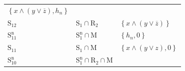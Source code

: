 \documentclass[10pt,a4paper]{article}
\newcommand{\ovl}{\overline}
\newcommand{\set}[1]{\left\{#1\right\}}
\newcommand{\clonefont}[1]{\mathrm{#1}}
\begin{document}
\begin{figure}[hbtp]
\begin{small}
\begin{longtable}[]{p{}p{}p{}}
\begin{minipage}[t]{0.38\columnwidth}
                \(\set{x \land (y \lor \ovl{z}), h_n}\)\strut
            \end{minipage}\tabularnewline
            \begin{minipage}[t]{0.12\columnwidth}\raggedright
                \(\clonefont{S_{12}}\)\strut
            \end{minipage} & \begin{minipage}[t]{0.41\columnwidth}\raggedright
                \(\clonefont{S_1} \cap \clonefont{R_2}\)\strut
            \end{minipage} & \begin{minipage}[t]{0.38\columnwidth}\raggedright
                \(\set{x \land (y \lor \ovl{z})}\)\strut
            \end{minipage}\tabularnewline
            \begin{minipage}[t]{0.12\columnwidth}\raggedright
                \(\clonefont{S_{11}^n}\)\strut
            \end{minipage} & \begin{minipage}[t]{0.41\columnwidth}\raggedright
                \(\clonefont{S_1^n} \cap \clonefont{M}\)\strut
            \end{minipage} & \begin{minipage}[t]{0.38\columnwidth}\raggedright
                \(\set{h_n, 0}\)\strut
            \end{minipage}\tabularnewline
            \begin{minipage}[t]{0.12\columnwidth}\raggedright
                \(\clonefont{S_{11}}\)\strut
            \end{minipage} & \begin{minipage}[t]{0.41\columnwidth}\raggedright
                \(\clonefont{S_1} \cap \clonefont{M}\)\strut
            \end{minipage} & \begin{minipage}[t]{0.38\columnwidth}\raggedright
                \(\set{x \land (y \lor z), 0}\)\strut
            \end{minipage}\tabularnewline
            \begin{minipage}[t]{0.12\columnwidth}\raggedright
                \(\clonefont{S_{10}^n}\)\strut
            \end{minipage} & \begin{minipage}[t]{0.41\columnwidth}\raggedright
                \(\clonefont{S_1^n} \cap \clonefont{R_2} \cap \clonefont{M}\)\strut
            \end{minipage} & \begin{minipage}[t]{0.38\columnwidth}\raggedright

\end{minipage}
\end{longtable}
\end{small}
\end{figure}
\end{document}
